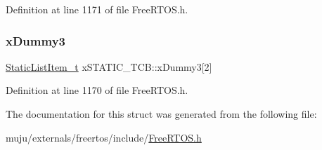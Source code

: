 Definition at line 1171 of file Free\+R\+T\+O\+S.\+h.

\mbox{\label{structx_s_t_a_t_i_c___t_c_b_a7f182aa8f5003494f63d975dabcb3ec1}} 
\subsubsection{\texorpdfstring{x\+Dummy3}{xDummy3}}
{\footnotesize\ttfamily \hyperlink{externals_2freertos_2include_2_free_r_t_o_s_8h_a1d31bc0472385a87424518da484d9e09}{Static\+List\+Item\+\_\+t} x\+S\+T\+A\+T\+I\+C\+\_\+\+T\+C\+B\+::x\+Dummy3\mbox{[}2\mbox{]}}



Definition at line 1170 of file Free\+R\+T\+O\+S.\+h.



The documentation for this struct was generated from the following file\+:\begin{DoxyCompactItemize}
\item 
muju/externals/freertos/include/\hyperlink{externals_2freertos_2include_2_free_r_t_o_s_8h}{Free\+R\+T\+O\+S.\+h}\end{DoxyCompactItemize}
